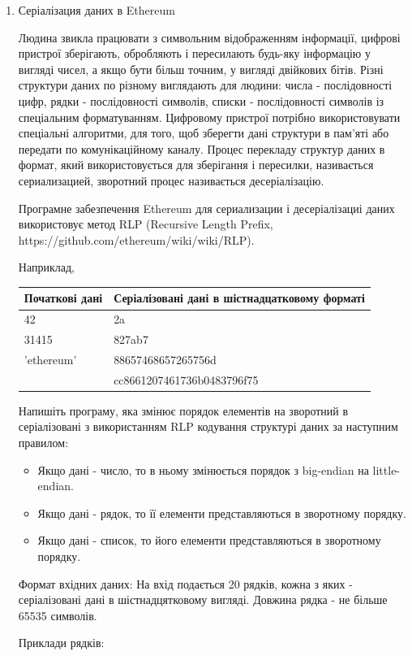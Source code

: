 \documentclass[]{article}
\begin{document}
\begin{enumerate}
\item
Серіалізация даних в Ethereum

Людина звикла працювати з символьним відображенням інформації, цифрові пристрої зберігають, обробляють і пересилають будь-яку інформацію у вигляді чисел, а якщо бути більш точним, у вигляді двійкових бітів. Різні структури даних по різному виглядають для людини: числа - послідовності цифр, рядки - послідовності символів, списки - послідовності символів із спеціальним форматуванням. Цифровому пристрої потрібно використовувати спеціальні алгоритми, для того, щоб зберегти дані структури в пам'яті або передати по комунікаційному каналу. Процес перекладу структур даних в формат, який використовується для зберігання і пересилки, називається сериализацией, зворотний процес називається десеріалізацію.

Програмне забезпечення Ethereum для сериализации і десеріалізациі даних використовує метод 
 RLP (Recursive
Length Prefix, https://github.com/ethereum/wiki/wiki/RLP).

Наприклад, 

\begin{tabular} {| l | l |} \hline 
 Початкові дані & Серіалізовані дані в шістнадцатковому форматі \\ \hline 
42 & 2a \\ \hline 
31415 & 827ab7 \\ \hline 
'ethereum' & 88657468657265756d \\ \hline 
[ 'a \ task' , 4, 'you'] & cc8661207461736b0483796f75 \\ \hline 
\end{tabular}


Напишіть програму, яка змінює порядок елементів на зворотний в серіалізовані з використанням RLP кодування структурі даних за наступним правилом:
\begin{itemize}
\item
    Якщо дані - число, то в ньому змінюється порядок з big-endian на little-endian.
\item
    Якщо дані - рядок, то її елементи представляються в зворотному порядку.
\item
    Якщо дані - список, то його елементи представляються в зворотному порядку.
\end{itemize}

Формат вхідних даних:
На вхід подається 20 рядків, кожна з яких - серіалізовані дані в шістнадцятковому вигляді. Довжина рядка - не більше 65535 символів.

Приклади рядків: 


\end{enumerate}
\end{document}
